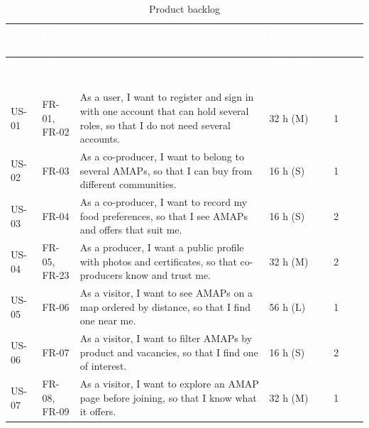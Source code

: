 \documentclass[11pt,a4paper]{article}
\begin{document}
{\footnotesize
\begin{longtable}{>{\raggedright\arraybackslash\hspace{0pt}}p{}>{\raggedright\arraybackslash\hspace{0pt}}p{}>{\raggedright\arraybackslash\hspace{0pt}}p{}>{\raggedright\arraybackslash\hspace{0pt}}p{}>{\raggedright\arraybackslash\hspace{0pt}}p{}}
\caption{Product backlog}\\
\rowcolor{hdr}\textcolor{white}{\textbf{US Nr.}} & \textcolor{white}{\textbf{IR Nr.}} & \textcolor{white}{\textbf{User story}} & \textcolor{white}{\textbf{Estimate (hours)}} & \textcolor{white}{\textbf{Prio.}} \\ \endfirsthead
\rowcolor{hdr}\textcolor{white}{\textbf{US Nr.}} & \textcolor{white}{\textbf{IR Nr.}} & \textcolor{white}{\textbf{User story}} & \textcolor{white}{\textbf{Estimate (hours)}} & \textcolor{white}{\textbf{Prio.}} \\ \endhead
US-01 & FR-01, FR-02 & As a user, I want to register and sign in with one account that can hold several roles, so that I do not need several accounts. & 32 h (M) & 1 \\ \hline
US-02 & FR-03 & As a co-producer, I want to belong to several AMAPs, so that I can buy from different communities. & 16 h (S) & 1 \\ \hline
US-03 & FR-04 & As a co-producer, I want to record my food preferences, so that I see AMAPs and offers that suit me. & 16 h (S) & 2 \\ \hline
US-04 & FR-05, FR-23 & As a producer, I want a public profile with photos and certificates, so that co-producers know and trust me. & 32 h (M) & 2 \\ \hline
US-05 & FR-06 & As a visitor, I want to see AMAPs on a map ordered by distance, so that I find one near me. & 56 h (L) & 1 \\ \hline
US-06 & FR-07 & As a visitor, I want to filter AMAPs by product and vacancies, so that I find one of interest. & 16 h (S) & 2 \\ \hline
US-07 & FR-08, FR-09 & As a visitor, I want to explore an AMAP page before joining, so that I know what it offers. & 32 h (M) & 1 \\ \hline

\end{longtable}}
\end{document}
